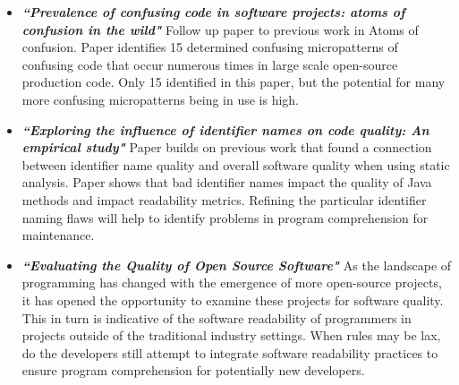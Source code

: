 \documentclass[a4paper, 10pt]{IEEEtran}
\begin{document}
\begin{itemize}
    \item \textbf{\textit{“Prevalence of confusing code in software projects: atoms of confusion in the wild"}}
    Follow up paper to previous work in Atoms of confusion. Paper identifies 15 determined confusing micropatterns of confusing code that occur numerous times in large scale open-source production code. Only 15 identified in this paper, but the potential for many more confusing micropatterns being in use is high. 
    \item \textbf{\textit{“Exploring the influence of identifier names on code quality: An empirical study"}}
    Paper builds on previous work that found a connection between identifier name quality and overall software quality when using static analysis. Paper shows that bad identifier names impact the quality of Java methods and impact readability metrics. Refining the particular identifier naming flaws will help to identify problems in program comprehension for maintenance.

\item \textbf{\textit{“Evaluating the Quality of Open Source Software"}}
    As the landscape of programming has changed with the emergence of more open-source projects, it has opened the opportunity to examine these projects for software quality. This in turn is indicative of the software readability of programmers in projects outside of the traditional industry settings. When rules may be lax, do the developers still attempt to integrate software readability practices to ensure program comprehension for potentially new developers. 

\end{itemize}
\end{document}
